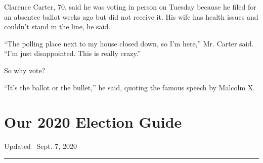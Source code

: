 Clarence Carter, 70, said he was voting in person on Tuesday because he
filed for an absentee ballot weeks ago but did not receive it. His wife
has health issues and couldn't stand in the line, he said.

``The polling place next to my house closed down, so I'm here,'' Mr.
Carter said. ``I'm just disappointed. This is really crazy.''

So why vote?

``It's the ballot or the bullet,'' he said, quoting the famous speech by
Malcolm X.

\hypertarget{our-2020-election-guide}{%
\section{Our 2020 Election Guide}\label{our-2020-election-guide}}

Updated ~Sept. 7, 2020

\begin{center}\rule{0.5\linewidth}{\linethickness}\end{center}

